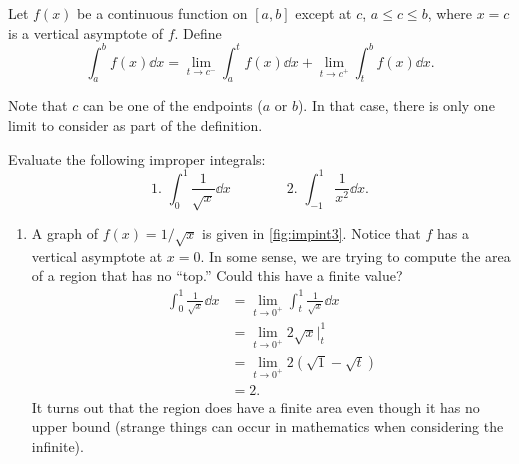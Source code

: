 \begin{definition}\label{def:imp_int2}
Let $f(x)$ be a continuous function on $[a,b]$ except at $c$, $a\leq c\leq b$, where $x=c$ is a vertical asymptote of $f$. Define
\[\int_a^b f(x)\dd x = \lim_{t\to c^-}\int_a^t f(x)\dd x + \lim_{t\to c^+}\int_t^b f(x)\dd x.\]
\end{definition}

Note that $c$ can be one of the endpoints ($a$ or $b$). In that case, there is only one limit to consider as part of the definition.

\begin{example}\label{ex_impint3}
Evaluate the following improper integrals:
\[
 \text{1. }\int_0^1\frac1{\sqrt{x}}\dd x\qquad\qquad
 \text{2. }\int_{-1}^1\frac{1}{x^2}\dd x.
\]
\solution
\begin{enumerate}
\item		A graph of $f(x) = 1/\sqrt{x}$ is given in \autoref{fig:impint3}.
%
%
Notice that $f$ has a vertical asymptote at $x=0$. In some sense, we are trying to compute the area of a region that has no ``top.'' Could this have a finite value? 
\begin{align*}
	\int_0^1 \frac{1}{\sqrt{x}}\dd x
	&= \lim_{t\to0^+}\int_t^1 \frac1{\sqrt{x}}\dd x \\
	&= \lim_{t\to0^+} 2\sqrt{x}\Big|_t^1 \\
	&= \lim_{t\to0^+} 2\left(\sqrt{1}-\sqrt{t}\right)\\
	&=	2.
\end{align*}
It turns out that the region does have a finite area even though it has no upper bound (strange things can occur in mathematics when considering the infinite).


\end{enumerate}
\end{example}

